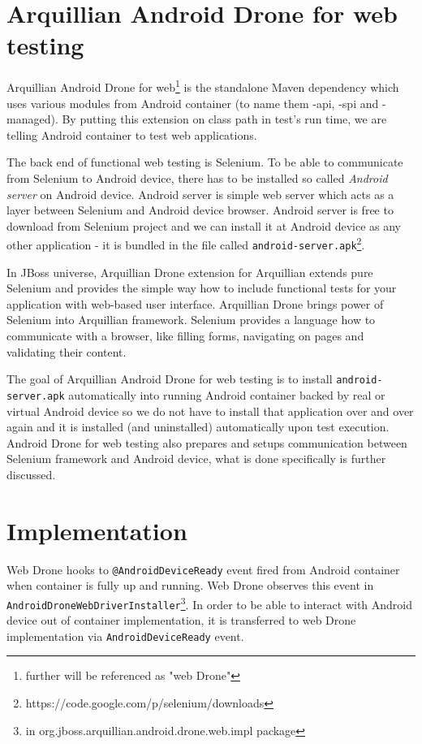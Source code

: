 \documentclass[12pt,final,oneside]{fithesis}
\begin{document}
	\section{Arquillian Android Drone for web testing}

Arquillian Android Drone for web\footnote{further will be referenced as "web Drone"} is the standalone Maven dependency which uses various modules from Android container (to name them -api, -spi and -managed). By putting this extension on class path in test's run time, we are telling Android container to test web applications.

The back end of functional web testing is Selenium. To be able to communicate from Selenium to Android device, there has to be installed so called \textit{Android server} on Android device. Android server is simple web server which acts as a layer between Selenium and Android device browser. Android server is free to download from Selenium project and we can install it at Android device as any other application - it is bundled in the file called \texttt{android-server.apk}\footnote{https://code.google.com/p/selenium/downloads}.

In JBoss universe, Arquillian Drone extension for Arquillian extends pure Selenium and provides the simple way how to include functional tests for your application with web-based user interface. Arquillian Drone brings power of Selenium into Arquillian framework. Selenium provides a language how to communicate with a browser, like filling forms, navigating on pages and validating their content.\cite{bib131}

The goal of Arquillian Android Drone for web testing is to install \texttt{android-server.apk} automatically into running Android container backed by real or virtual Android device so we do not have to install that application over and over again and it is installed (and uninstalled) automatically upon test execution. Android Drone for web testing also prepares and setups communication between Selenium framework and Android device, what is done specifically is further discussed.

	\section{Implementation}

Web Drone hooks to \texttt{@AndroidDeviceReady} event fired from Android container when container is fully up and running. Web Drone observes this event in \texttt{AndroidDroneWebDriverInstaller}\footnote{in org.jboss.arquillian.android.drone.web.impl package}. In order to be able to interact with Android device out of container implementation, it is transferred to web Drone implementation via \texttt{AndroidDeviceReady} event.
\end{document}
